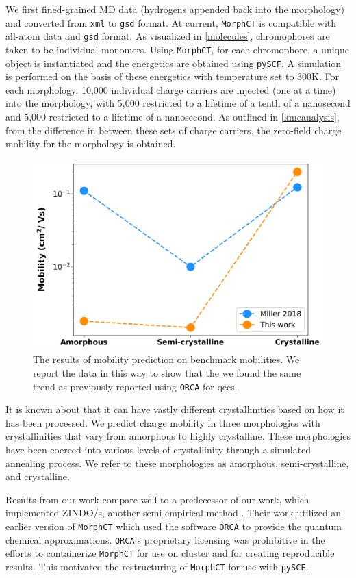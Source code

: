 We first fined-grained MD data (hydrogens appended back into
the morphology) and converted from \texttt{xml} to \texttt{gsd} format. At
current, \texttt{MorphCT} is compatible with all-atom data and \texttt{gsd} format. 
As visualized in \autoref{molecules}, chromophores are taken to be individual monomers. 
Using \texttt{MorphCT}, for each chromophore, a unique object is instantiated and the energetics are obtained using
\texttt{pySCF}. A  simulation is performed on the basis of these energetics with  temperature set to 300K. For
each morphology, 10,000 individual charge carriers are injected (one at a time) into the morphology, with
5,000 restricted to a lifetime of a tenth of a nanosecond and 5,000 restricted
to a lifetime of a nanosecond.
As outlined in \autoref{kmcanalysis}, from the difference in 
between these sets of charge carriers, the
zero-field charge mobility for the morphology is obtained. 

\begin{figure}
  \center
  \includegraphics[width = .6\textwidth]{figures/validation.png}
  \caption{The results of mobility prediction on benchmark  mobilities. We report the data in this way to
    show that the we found the same trend as previously reported using \texttt{ORCA} for \gls{qcc}s. }
  \label{mobility-validation}
\end{figure}

It is known about  that it can have vastly different crystallinities based on how it has been processed. 
We predict charge mobility in three morphologies with crystallinities that vary from amorphous
to highly crystalline. These morphologies have been coerced into various levels
of crystallinity through a simulated annealing process. 
We refer to these morphologies as amorphous, semi-crystalline, and crystalline.

Results from our work compare well to a predecessor of our work, which implemented ZINDO/s, another
semi-empirical  method \cite{Miller2018a}\cite{Jones2017}. 
Their work utilized an earlier version of \texttt{MorphCT} which used the  software 
\texttt{ORCA} \cite{Neese2012b} to provide the quantum chemical approximations. 
\texttt{ORCA}'s proprietary licensing was prohibitive in the efforts to containerize \texttt{MorphCT} for use on cluster and for
creating reproducible results. This motivated the restructuring of \texttt{MorphCT} for use with \texttt{pySCF}.

